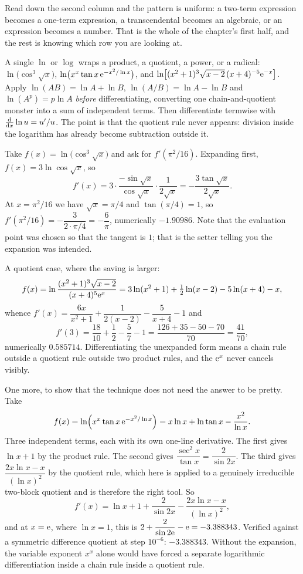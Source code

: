 Read down the second column and the pattern is uniform: a two-term expression becomes a one-term expression, a transcendental becomes an algebraic, or an expression becomes a number. That is the whole of the chapter's first half, and the rest is knowing which row you are looking at.

\cue A single $\ln$ or $\log$ wraps a product, a quotient, a power, or a radical: $\ln\bigl(\cos^{3}\sqrt{x}\bigr)$, $\ln\bigl(x^{x}\tan x\,\mathrm{e}^{-x^{2}/\ln x}\bigr)$, and $\ln\bigl[(x^{2}+1)^{3}\sqrt{x-2}\,(x+4)^{-5}\mathrm{e}^{-x}\bigr]$.
\method Apply $\ln(AB)=\ln A+\ln B$, $\ln(A/B)=\ln A-\ln B$ and $\ln(A^{p})=p\ln A$ \emph{before} differentiating, converting one chain-and-quotient monster into a sum of independent terms. Then differentiate termwise with $\frac{\mathrm{d}}{\mathrm{d}x}\ln u=u'/u$. The point is that the quotient rule never appears: division inside the logarithm has already become subtraction outside it.

\begin{worked}
Take $f(x)=\ln\bigl(\cos^{3}\sqrt{x}\bigr)$ and ask for $f'(\pi^{2}/16)$. Expanding first, $f(x)=3\ln\cos\sqrt{x}$, so
\[
f'(x)=3\cdot\frac{-\sin\sqrt{x}}{\cos\sqrt{x}}\cdot\frac{1}{2\sqrt{x}}=-\frac{3\tan\sqrt{x}}{2\sqrt{x}}.
\]
At $x=\pi^{2}/16$ we have $\sqrt{x}=\pi/4$ and $\tan(\pi/4)=1$, so $f'(\pi^{2}/16)=-\dfrac{3}{2\cdot\pi/4}=-\dfrac{6}{\pi}$, numerically $-1.90986$. Note that the evaluation point was chosen so that the tangent is $1$; that is the setter telling you the expansion was intended.

A quotient case, where the saving is larger:
\[
f(x)=\ln\frac{(x^{2}+1)^{3}\sqrt{x-2}}{(x+4)^{5}\mathrm{e}^{x}}=3\ln(x^{2}+1)+\tfrac12\ln(x-2)-5\ln(x+4)-x,
\]
whence $f'(x)=\dfrac{6x}{x^{2}+1}+\dfrac{1}{2(x-2)}-\dfrac{5}{x+4}-1$ and
\[
f'(3)=\frac{18}{10}+\frac12-\frac57-1=\frac{126+35-50-70}{70}=\frac{41}{70},
\]
numerically $0.585714$. Differentiating the unexpanded form means a chain rule outside a quotient rule outside two product rules, and the $\mathrm{e}^{x}$ never cancels visibly.

One more, to show that the technique does not need the answer to be pretty. Take
\[
f(x)=\ln\Bigl(x^{x}\tan x\,\mathrm{e}^{-x^{2}/\ln x}\Bigr)=x\ln x+\ln\tan x-\frac{x^{2}}{\ln x}.
\]
Three independent terms, each with its own one-line derivative. The first gives $\ln x+1$ by the product rule. The second gives $\dfrac{\sec^{2}x}{\tan x}=\dfrac{2}{\sin 2x}$. The third gives $\dfrac{2x\ln x-x}{(\ln x)^{2}}$ by the quotient rule, which here is applied to a genuinely irreducible two-block quotient and is therefore the right tool. So
\[
f'(x)=\ln x+1+\frac{2}{\sin 2x}-\frac{2x\ln x-x}{(\ln x)^{2}},
\]
and at $x=\mathrm{e}$, where $\ln x=1$, this is $2+\dfrac{2}{\sin 2\mathrm{e}}-\mathrm{e}=-3.388343$. Verified against a symmetric difference quotient at step $10^{-6}$: $-3.388343$. Without the expansion, the variable exponent $x^{x}$ alone would have forced a separate logarithmic differentiation inside a chain rule inside a quotient rule.
\end{worked}

